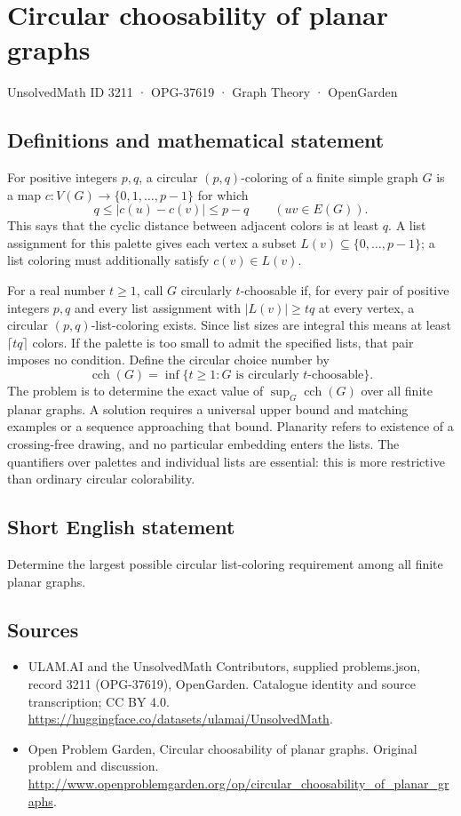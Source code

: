 \documentclass[11pt,a4paper]{article}
\begin{document}
\section*{Circular choosability of planar graphs}\label{3211}
{\small UnsolvedMath ID 3211 · OPG-37619 · Graph Theory · OpenGarden}
\subsection{Definitions and mathematical statement}
For positive integers $p,q$, a circular $(p,q)$-coloring of a finite simple graph $G$ is a map $c:V(G)\to\{0,1,\ldots,p-1\}$ for which
\[
 q\le |c(u)-c(v)|\le p-q\qquad(uv\in E(G)).
\]
This says that the cyclic distance between adjacent colors is at least $q$. A list assignment for this palette gives each vertex a subset $L(v)\subseteq\{0,\ldots,p-1\}$; a list coloring must additionally satisfy $c(v)\in L(v)$.

For a real number $t\ge1$, call $G$ circularly $t$-choosable if, for every pair of positive integers $p,q$ and every list assignment with $|L(v)|\ge tq$ at every vertex, a circular $(p,q)$-list-coloring exists. Since list sizes are integral this means at least $\lceil tq\rceil$ colors. If the palette is too small to admit the specified lists, that pair imposes no condition. Define the circular choice number by
\[
 \operatorname{cch}(G)=\inf\{t\ge1:G\text{ is circularly }t\text{-choosable}\}.
\]
The problem is to determine the exact value of $\sup_G\operatorname{cch}(G)$ over all finite planar graphs. A solution requires a universal upper bound and matching examples or a sequence approaching that bound. Planarity refers to existence of a crossing-free drawing, and no particular embedding enters the lists. The quantifiers over palettes and individual lists are essential: this is more restrictive than ordinary circular colorability.
\subsection{Short English statement}
Determine the largest possible circular list-coloring requirement among all finite planar graphs.
\subsection{Sources}
\begin{itemize}
\item[S1] ULAM.AI and the UnsolvedMath Contributors, supplied problems.json, record 3211 (OPG-37619), OpenGarden. Catalogue identity and source transcription; CC BY 4.0.
\url{https://huggingface.co/datasets/ulamai/UnsolvedMath}.
\item[S2] Open Problem Garden, Circular choosability of planar graphs. Original problem and discussion.
\url{http://www.openproblemgarden.org/op/circular_choosability_of_planar_graphs}.
\end{itemize}
\end{document}
